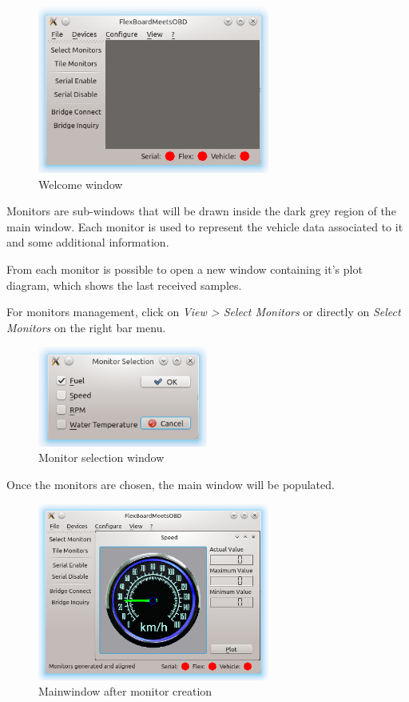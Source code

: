\documentclass[twoside]{article}
\begin{document}
\begin{multicols}{2}
\begin{figure}[H]
  \centering
  \includegraphics[width=3in]{img/GUI/welcome_window}
  \caption{Welcome window}
\end{figure}

Monitors are sub-windows that will be drawn inside the dark grey region of the main window. Each monitor is used to represent the vehicle data associated to it and some additional information.

From each monitor is possible to open a new window containing it's plot diagram, which shows the last received samples.

For monitors management, click on \emph{View > Select Monitors} or directly on \emph{Select Monitors} on the right bar menu.

\begin{figure}[H]
  \centering
  \includegraphics[width=2.2in]{img/GUI/monitor_selection}
  \caption{Monitor selection window}
\end{figure}

Once the monitors are chosen, the main window will be populated.

\begin{figure}[H]
  \centering
  \includegraphics[width=3in]{img/GUI/monitor_created}
  \caption{Mainwindow after monitor creation}
\end{figure}


\end{multicols}
\end{document}
